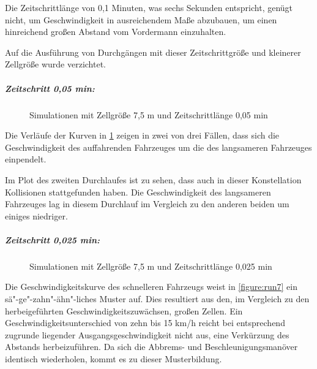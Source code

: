 Die Zeitschrittlänge von 0,1 Minuten, was sechs Sekunden entspricht, genügt nicht, um Geschwindigkeit in ausreichendem Maße abzubauen, um einen hinreichend großen Abstand vom Vordermann einzuhalten.

Auf die Ausführung von Durchgängen mit dieser Zeitschrittgröße und kleinerer Zellgröße wurde verzichtet.


\subparagraph*{Zeitschritt 0,05 min:}
\begin{figure}[hptb]
  \centering 
   \qquad 
   \qquad 
  \caption{Simulationen mit Zellgröße 7,5 m und Zeitschrittlänge 0,05 min} 
  \label{figure:run4-6}
\end{figure}
Die Verläufe der Kurven in \cref{figure:run4-6} zeigen in zwei von drei Fällen, dass sich die Geschwindigkeit des auffahrenden Fahrzeuges um die des langsameren Fahrzeuges einpendelt.

Im Plot des zweiten Durchlaufes ist zu sehen, dass auch in dieser Konstellation Kollisionen stattgefunden haben.
Die Geschwindigkeit des langsameren Fahrzeuges lag in diesem Durchlauf im Vergleich zu den anderen beiden um einiges niedriger.

\subparagraph*{Zeitschritt 0,025 min:}
\begin{figure}[hptb]
  \centering 
   \qquad 
   \qquad 
  \caption{Simulationen mit Zellgröße 7,5 m und Zeitschrittlänge 0,025 min} 
  \label{figure:run7-9}
\end{figure}

Die Geschwindigkeitskurve des schnelleren Fahrzeugs weist in \cref{figure:run7} ein sä"-ge"-zahn"-ähn"-liches Muster auf.
Dies resultiert aus den, im Vergleich zu den herbeigeführten Geschwindigkeitszuwächsen, großen Zellen.
Ein Geschwindigkeitsunterschied von zehn bis 15 km/h reicht bei entsprechend zugrunde liegender Ausgangsgeschwindigkeit nicht aus, eine Verkürzung des Abstands herbeizuführen.
Da sich die Abbrems- und Beschleunigungsmanöver identisch wiederholen, kommt es zu dieser Musterbildung.

